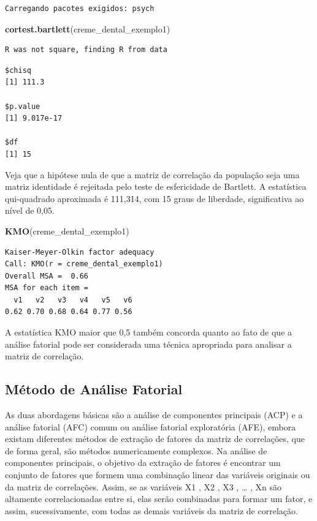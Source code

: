 \documentclass[12pt,brazil,oneside]{book}
\newenvironment{Shaded}{\begin{snugshade}}{\end{snugshade}}
\newcommand{\KeywordTok}[1]{\textcolor[rgb]{0.13,0.29,0.53}{\textbf{#1}}}
\newcommand{\NormalTok}[1]{#1}
\begin{document}
\begin{verbatim}
Carregando pacotes exigidos: psych
\end{verbatim}

\begin{Shaded}
\begin{Highlighting}[]
\KeywordTok{cortest.bartlett}\NormalTok{(creme_dental_exemplo1)}
\end{Highlighting}
\end{Shaded}

\begin{verbatim}
R was not square, finding R from data
\end{verbatim}

\begin{verbatim}
$chisq
[1] 111.3

$p.value
[1] 9.017e-17

$df
[1] 15
\end{verbatim}

Veja que a hipótese nula de que a matriz de correlação da população seja
uma matriz identidade é rejeitada pelo teste de esfericidade de
Bartlett. A estatística qui-quadrado aproximada é 111,314, com 15 graus
de liberdade, significativa ao nível de 0,05.

\begin{Shaded}
\begin{Highlighting}[]
\KeywordTok{KMO}\NormalTok{(creme_dental_exemplo1)}
\end{Highlighting}
\end{Shaded}

\begin{verbatim}
Kaiser-Meyer-Olkin factor adequacy
Call: KMO(r = creme_dental_exemplo1)
Overall MSA =  0.66
MSA for each item = 
  v1   v2   v3   v4   v5   v6 
0.62 0.70 0.68 0.64 0.77 0.56 
\end{verbatim}

A estatística KMO maior que 0,5 também concorda quanto ao fato de que a
análise fatorial pode ser considerada uma técnica apropriada para
analisar a matriz de correlação.

\hypertarget{metodo-de-analise-fatorial}{%
\subsection{Método de Análise
Fatorial}\label{metodo-de-analise-fatorial}}

As duas abordagens básicas são a análise de componentes principais (ACP)
e a análise fatorial (AFC) comum ou análise fatorial exploratória (AFE),
embora existam diferentes métodos de extração de fatores da matriz de
correlações, que de forma geral, são métodos numericamente complexos. Na
análise de componentes principais, o objetivo da extração de fatores é
encontrar um conjunto de fatores que formem uma combinação linear das
variáveis originais ou da matriz de correlações. Assim, se as variáveis
X1 , X2 , X3 , \ldots{} , Xn são altamente correlacionadas entre si,
elas serão combinadas para formar um fator, e assim, sucessivamente, com
todas as demais variáveis da matriz de correlação.
\end{document}
